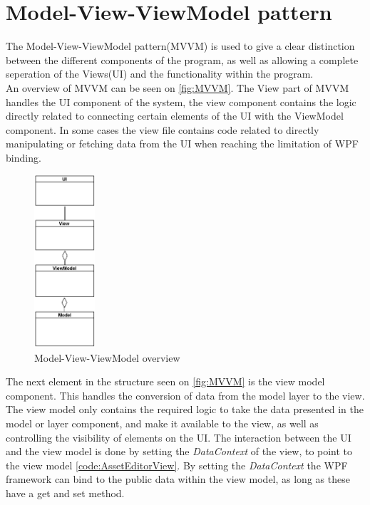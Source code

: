 \section{Model-View-ViewModel pattern} \label{sc:MVCVM}
The Model-View-ViewModel pattern(MVVM) is used to give a clear distinction between the different components of the program, as well as allowing a complete seperation of the Views(UI) and the functionality within the program. \\
An overview of MVVM can be seen on \autoref{fig:MVVM}.
The View part of MVVM handles the UI component of the system, the view component contains the logic directly related to connecting certain elements of the UI with the ViewModel component. In some cases the view file contains code related to directly manipulating or fetching data from the UI when reaching the limitation of WPF binding.

\begin{figure}[H]
    \centering
    \includegraphics[width=0.2\textwidth]{figures/Implementation/MVVM.PNG}
    \caption{Model-View-ViewModel overview}
    \label{fig:MVVM}
\end{figure}

The next element in the structure seen on \autoref{fig:MVVM} is the view model component. This handles the conversion of data from the model layer to the view. The view model only contains the required logic to take the data presented in the model or layer component, and make it available to the view, as well as controlling the visibility of elements on the UI. The interaction between the UI and the view model is done by setting the \textit{DataContext} of the view, to point to the view model \autoref{code:AssetEditorView}. By setting the \textit{DataContext} the WPF framework can bind to the public data within the view model, as long as these have a get and set method.

